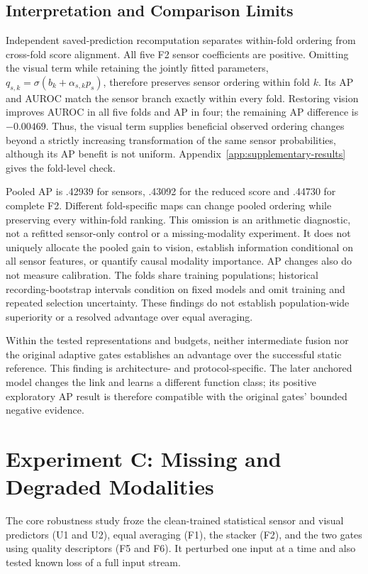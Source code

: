 \subsection{Interpretation and Comparison Limits}
Independent saved-prediction recomputation separates within-fold ordering from
cross-fold score alignment. All five F2 sensor coefficients are positive. Omitting the
visual term while retaining the jointly fitted parameters,
$q_{s,k}=\sigma(b_k+\alpha_{s,k}p_s)$, therefore preserves sensor ordering within fold
$k$. Its AP and AUROC match the sensor branch exactly within every fold. Restoring
vision improves AUROC in all five folds and AP in four; the remaining AP difference is
$-0.00469$. Thus, the visual term supplies beneficial observed ordering changes beyond a
strictly increasing transformation of the same sensor probabilities, although its AP
benefit is not uniform. Appendix~\ref{app:supplementary-results} gives the fold-level
check.

Pooled AP is .42939 for sensors, .43092 for the reduced score and .44730 for complete
F2. Different fold-specific maps can change pooled ordering while preserving every
within-fold ranking. This omission is an arithmetic diagnostic, not a refitted
sensor-only control or a missing-modality experiment. It does not uniquely allocate the
pooled gain to vision, establish information conditional on all sensor features, or
quantify causal modality importance. AP changes also do not measure calibration. The
folds share training populations; historical recording-bootstrap intervals condition on
fixed models and omit training and repeated selection uncertainty. These findings do not
establish population-wide superiority or a resolved advantage over equal
averaging.

Within the tested representations and budgets, neither intermediate fusion nor the
original adaptive gates establishes an advantage over the successful static reference.
This finding is architecture- and protocol-specific. The later anchored model changes
the link and learns a different function class; its positive exploratory AP result is
therefore compatible with the original gates' bounded negative evidence.

\section{Experiment C: Missing and Degraded Modalities}
The core robustness study froze the clean-trained statistical sensor and visual
predictors (U1 and U2), equal averaging (F1), the stacker (F2), and the two gates using
quality descriptors (F5 and F6). It perturbed one input at a time and also tested known
loss of a full input stream.


